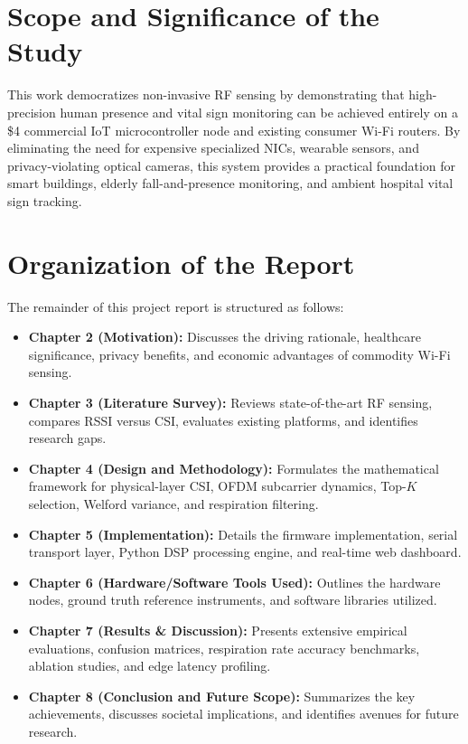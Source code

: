 \section{Scope and Significance of the Study}
This work democratizes non-invasive RF sensing by demonstrating that high-precision human presence and vital sign monitoring can be achieved entirely on a \$4 commercial IoT microcontroller node and existing consumer Wi-Fi routers. By eliminating the need for expensive specialized NICs, wearable sensors, and privacy-violating optical cameras, this system provides a practical foundation for smart buildings, elderly fall-and-presence monitoring, and ambient hospital vital sign tracking.

\section{Organization of the Report}
The remainder of this project report is structured as follows:
\begin{itemize}
    \item \textbf{Chapter 2 (Motivation):} Discusses the driving rationale, healthcare significance, privacy benefits, and economic advantages of commodity Wi-Fi sensing.
    \item \textbf{Chapter 3 (Literature Survey):} Reviews state-of-the-art RF sensing, compares RSSI versus CSI, evaluates existing platforms, and identifies research gaps.
    \item \textbf{Chapter 4 (Design and Methodology):} Formulates the mathematical framework for physical-layer CSI, OFDM subcarrier dynamics, Top-$K$ selection, Welford variance, and respiration filtering.
    \item \textbf{Chapter 5 (Implementation):} Details the firmware implementation, serial transport layer, Python DSP processing engine, and real-time web dashboard.
    \item \textbf{Chapter 6 (Hardware/Software Tools Used):} Outlines the hardware nodes, ground truth reference instruments, and software libraries utilized.
    \item \textbf{Chapter 7 (Results \& Discussion):} Presents extensive empirical evaluations, confusion matrices, respiration rate accuracy benchmarks, ablation studies, and edge latency profiling.
    \item \textbf{Chapter 8 (Conclusion and Future Scope):} Summarizes the key achievements, discusses societal implications, and identifies avenues for future research.
\end{itemize}
